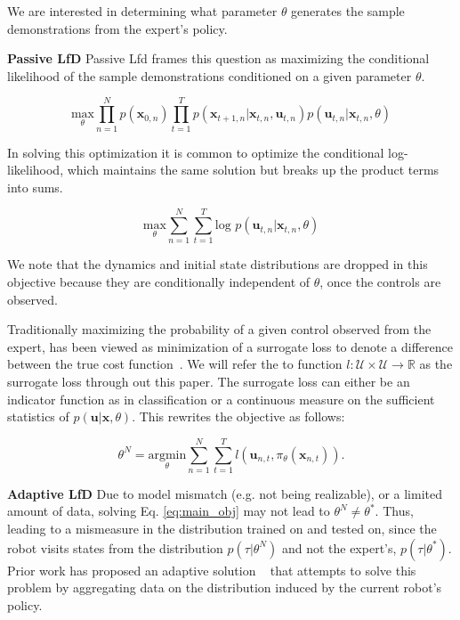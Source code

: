 \documentclass[10pt, conference]{ieeeconf}      %
\newcommand{\bu}{\mathbf{u}}
\newcommand{\bx}{\mathbf{x}}
\begin{document}
We are interested in determining what parameter $\theta$ generates the sample demonstrations from the expert's policy. 

\noindent \textbf{Passive LfD} Passive Lfd frames this  question as maximizing the conditional likelihood of the sample demonstrations conditioned on a given parameter $\theta$. 

$$\underset{\theta}{\mbox{max}} \prod^N_{n=1} p(\bx_{0,n}) \prod^T_{t=1} p(\bx_{t+1,n}|\bx_{t,n},\bu_{t,n})p(\bu_{t,n}|\bx_{t,n},\theta)$$

In solving this optimization it is common to optimize the conditional log-likelihood, which maintains the same solution but breaks up the product terms into sums. 

\begin{equation}\label{eq:m_likeli_obj}
\underset{\theta}{\mbox{max}} \sum^N_{n=1}\sum^T_{t=1}\mbox{log }p(\bu_{t,n}|\bx_{t,n},\theta)
\end{equation}


We note that the dynamics and initial state distributions are dropped in this objective because they are conditionally independent of $\theta$, once the controls are observed. 

 Traditionally maximizing the probability of a given control observed from the expert, has been viewed as minimization of a surrogate loss to denote a difference between the true cost function~\cite{ross2010reduction,ross2010efficient}. We will refer the to function $l : \mathcal{U} \times \mathcal{U} \rightarrow \mathbb{R}$ as the surrogate loss through out this paper. The surrogate loss can either be an indicator function as in classification or a continuous measure on the sufficient statistics of $p(\bu|\bx,\theta)$.  This rewrites the objective as follows: 

\begin{equation}\label{eq:main_obj}
\theta^N = \underset{\theta}{\mbox{argmin}} \sum^N_{n=1}\sum^T_{t=1} l(\bu_{n,t}, \pi_{\theta} (\bx_{n,t})).
\end{equation}


\noindent \textbf{Adaptive LfD} Due to model mismatch (e.g. not being realizable), or a limited amount of data, solving Eq. \ref{eq:main_obj} may not lead to $\theta^N \neq \theta^*$.  Thus, leading to a mismeasure in the distribution trained on and tested on, since the robot visits states from the distribution $p(\tau|\theta^N)$ and not the expert's, $p(\tau|\theta^*)$.  Prior work has proposed an adaptive solution ~\cite{ross2010reduction} that attempts to solve this problem by aggregating data on the distribution induced by the current robot's policy.
\end{document}
